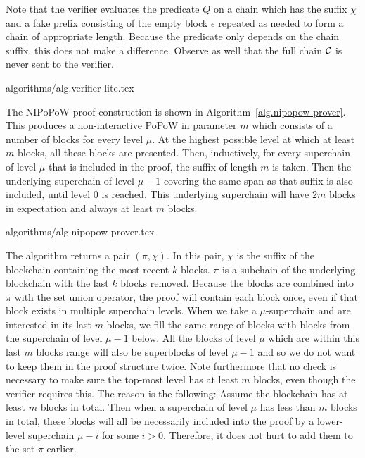 Note that the verifier evaluates the predicate $Q$ on a chain which has the
suffix $\chi$ and a fake prefix consisting of the empty block $\epsilon$
repeated as needed to form a chain of appropriate length. Because the predicate
only depends on the chain suffix, this does not make a difference. Observe as
well that the full chain $\mathcal{C}$ is never sent to the verifier.

{algorithms/alg.verifier-lite.tex}

The NIPoPoW proof construction is shown in Algorithm~\ref{alg.nipopow-prover}.
This produces a non-interactive PoPoW in parameter $m$ which consists of a
number of blocks for every level $\mu$. At the highest possible level at which
at least $m$ blocks, all these blocks are presented. Then, inductively, for
every superchain of level $\mu$ that is included in the proof, the suffix of
length $m$ is taken. Then the underlying superchain of level $\mu - 1$ covering
the same span as that suffix is also included, until level $0$ is reached. This
underlying superchain will have $2m$ blocks in expectation and always at least
$m$ blocks.

{algorithms/alg.nipopow-prover.tex}

The algorithm returns a pair $(\pi, \chi)$. In this pair, $\chi$ is the
suffix of the blockchain containing the most recent $k$ blocks. $\pi$ is
a subchain of the underlying blockchain with the last $k$ blocks removed.
Because the blocks are combined into $\pi$ with the set union operator,
the proof will contain each block once, even if that block exists in multiple
superchain levels. When we take a $\mu$-superchain and are interested
in its last $m$ blocks, we fill the same range of blocks with blocks from the
superchain of level $\mu - 1$ below.  All the blocks of level $\mu$ which are
within this last $m$ blocks range will also be superblocks of level $\mu - 1$
and so we do not want to keep them in the proof structure twice.  Note
furthermore that no check is necessary to make sure the top-most level has at
least $m$ blocks, even though the verifier requires this. The reason is the
following: Assume the blockchain has at least $m$ blocks in total. Then when a
superchain of level $\mu$ has less than $m$ blocks in total, these blocks will
all be necessarily included into the proof by a lower-level superchain $\mu -
i$ for some $i > 0$.  Therefore, it does not hurt to add them to the set
$\pi$ earlier.


